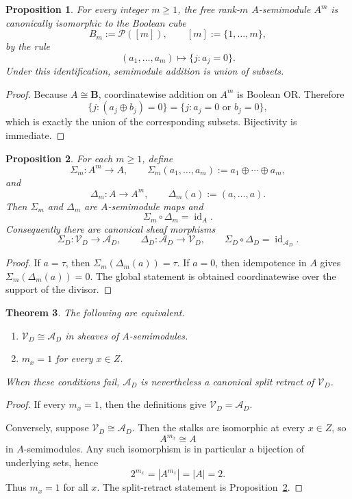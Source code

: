 \documentclass[11pt,a4paper]{article}
\numberwithin{equation}{section}
\newtheorem{theorem}{Theorem}[section]
\newtheorem{proposition}[theorem]{Proposition}
\theoremstyle{definition}
\theoremstyle{remark}
\newcommand{\BB}{\mathbf B}
\newcommand{\cP}{\mathcal P}
\newcommand{\cV}{\mathcal V}
\newcommand{\cA}{\mathcal A}
\newcommand{\taup}{\tau}
\begin{document}
\begin{proposition}\label{prop:boolean-cube}
For every integer $m\ge1$, the free rank-$m$ $A$-semimodule $A^m$ is canonically isomorphic to the Boolean cube
\[
B_m:=\cP([m]),\qquad [m]:=\{1,\dots,m\},
\]
by the rule
\[
(a_1,\dots,a_m)\longmapsto \{j:a_j=0\}.
\]
Under this identification, semimodule addition is union of subsets.
\end{proposition}

\begin{proof}
Because $A\cong\BB$, coordinatewise addition on $A^m$ is Boolean OR.  Therefore
\[
\{j:(a_j\oplus b_j)=0\}=\{j:a_j=0\text{ or }b_j=0\},
\]
which is exactly the union of the corresponding subsets.  Bijectivity is immediate.
\end{proof}

\begin{proposition}\label{prop:retract-shadow}
For each $m\ge1$, define
\[
\Sigma_m:A^m\to A,
\qquad
\Sigma_m(a_1,\dots,a_m):=a_1\oplus\cdots\oplus a_m,
\]
and
\[
\Delta_m:A\to A^m,
\qquad
\Delta_m(a):=(a,\dots,a).
\]
Then $\Sigma_m$ and $\Delta_m$ are $A$-semimodule maps and
\[
\Sigma_m\circ\Delta_m=\operatorname{id}_A.
\]
Consequently there are canonical sheaf morphisms
\[
\Sigma_D:\cV_D\to\cA_D,
\qquad
\Delta_D:\cA_D\to\cV_D,
\qquad
\Sigma_D\circ\Delta_D=\operatorname{id}_{\cA_D}.
\]
\end{proposition}

\begin{proof}
If $a=\taup$, then $\Sigma_m(\Delta_m(a))=\taup$.  If $a=0$, then idempotence in $A$ gives $\Sigma_m(\Delta_m(a))=0$.  The global statement is obtained coordinatewise over the support of the divisor.
\end{proof}

\begin{theorem}\label{thm:reduced-vs-multiplicity}
The following are equivalent.
\begin{enumerate}[label=(\roman*)]
\item $\cV_D\cong\cA_D$ in sheaves of $A$-semimodules.
\item $m_x=1$ for every $x\in Z$.
\end{enumerate}
When these conditions fail, $\cA_D$ is nevertheless a canonical split retract of $\cV_D$.
\end{theorem}

\begin{proof}
If every $m_x=1$, then the definitions give $\cV_D=\cA_D$.

Conversely, suppose $\cV_D\cong\cA_D$.  Then the stalks are isomorphic at every $x\in Z$, so
\[
A^{m_x}\cong A
\]
in $A$-semimodules.  Any such isomorphism is in particular a bijection of underlying sets, hence
\[
2^{m_x}=|A^{m_x}|=|A|=2.
\]
Thus $m_x=1$ for all $x$.  The split-retract statement is Proposition~\ref{prop:retract-shadow}.
\end{proof}
\end{document}
